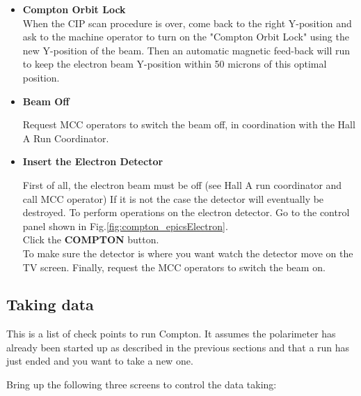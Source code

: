 \begin{itemize}
\item {\bf Compton Orbit Lock}\\
When the CIP scan  procedure is over, come back to the right Y-position and
        ask to the machine operator to turn on the "Compton Orbit Lock"  using  the new Y-position of the beam. Then an
        automatic magnetic feed-back will run to keep the electron beam Y-position
        within 50 microns of this optimal position. 


\item {\bf Beam Off}

Request  MCC operators to switch the beam off, in coordination with the Hall A Run Coordinator.

\item {\bf Insert the Electron Detector }

First of all, the electron beam must
be off (see Hall A run coordinator and call MCC operator)
If it is not the case the detector will eventually be destroyed.
To perform operations on the electron detector. Go to the control panel  shown in 
Fig.\ref{fig:compton_epicsElectron}.\\

Click the {\bf COMPTON} button.\\

To make sure the detector is where you want watch the detector move on the TV screen. 
Finally, request  the MCC operators to switch the beam on.
\end{itemize}

\subsection{Taking data}
This is a list of check points to run Compton. It assumes the polarimeter 
has already been started up as described in the previous sections and  
that a run has just ended and you want to take a 
new one.

Bring up the  following three screens to control the data taking:

